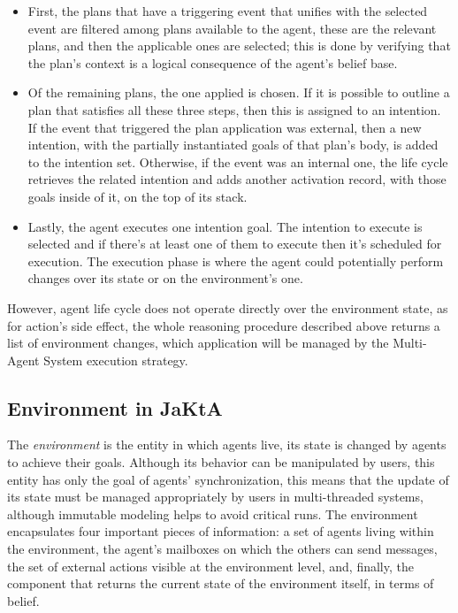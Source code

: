\begin{itemize}
    \item First, the plans that have a triggering event that unifies with the selected event are filtered among plans available to the agent, these are the relevant plans, and then the applicable ones are selected; this is done by verifying that the plan's context is a logical consequence of the agent's belief base.
    \item Of the remaining plans, the one applied is chosen. If it is possible to outline a plan that satisfies all these three steps, then this is assigned to an intention. If the event that triggered the plan application was external, then a new intention, with the partially instantiated goals of that plan's body, is added to the intention set. Otherwise, if the event was an internal one, the life cycle retrieves the related intention and adds another activation record, with those goals inside of it, on the top of its stack.
    \item Lastly, the agent executes one intention goal. The intention to execute is selected and if there's at least one of them to execute then it's scheduled for execution. The execution phase is where the agent could potentially perform changes over its state or on the environment's one.
\end{itemize}

However, agent life cycle does not operate directly over the environment state, as for action's side effect, the whole reasoning procedure described above returns a list of environment changes, which application will be managed by the Multi-Agent System execution strategy.

\subsection{Environment in JaKtA}

The \textit{environment} is the entity in which agents live, its state is changed by agents to achieve their goals. Although its behavior can be manipulated by users, this entity has only the goal of agents' synchronization, this means that the update of its state must be managed appropriately by users in multi-threaded systems, although immutable modeling helps to avoid critical runs. The environment encapsulates four important pieces of information: a set of agents living within the environment, the agent's mailboxes on which the others can send messages, the set of external actions visible at the environment level, and, finally, the component that returns the current state of the environment itself, in terms of belief.

